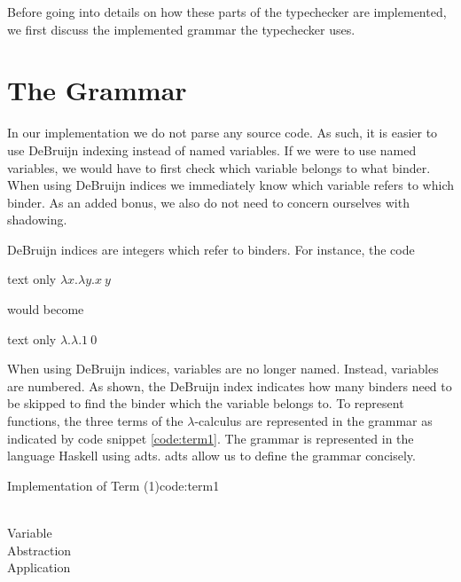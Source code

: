 Before going into details on how these parts of the typechecker are implemented, we first discuss the implemented grammar the typechecker uses.

\section{The Grammar}
In our implementation we do not parse any source code.
As such, it is easier to use DeBruijn indexing instead of named variables.
If we were to use named variables, we would have to first check which variable belongs to what binder.
When using DeBruijn indices we immediately know which variable refers to which binder.
As an added bonus, we also do not need to concern ourselves with shadowing.

DeBruijn indices are integers which refer to binders.
For instance, the code
\begin{changemargin}{1cm}{0cm}
\begin{expansionno}{text only}
$\lambda x.\lambda y. x \: y$
\end{expansionno}
\end{changemargin}
would become
\begin{changemargin}{1cm}{0cm}
\begin{expansionno}{text only}
$\lambda. \lambda. 1 \: 0$
\end{expansionno}
\end{changemargin}

When using DeBruijn indices, variables are no longer named. 
Instead, variables are numbered.
As shown, the DeBruijn index indicates how many binders need to be skipped to find the binder which the variable belongs to.
To represent functions, the three terms of the $\lambda$-calculus are represented in the grammar as indicated by code snippet \ref{code:term1}.  
The grammar is represented in the language Haskell using \glspl{adt}.
\glspl{adt} allow us to define the grammar concisely. 

\begin{texexptitled}{Implementation of Term (1)}{code:term1}
\begin{hscode}\SaveRestoreHook
{}%
%
%
%
%
%
\>[B]{}\;\mathrel{=}\<[E]%
\\[\blanklineskip]%
\>[B]{}\;\<[13]%
\>[13]{}\mathrel{=}{}\<[13E]%
\>[17]{}\;\<[37]%
\>[37]{}\mbox{\onelinecomment  Variable}{}\<[E]%
\\
\>[13]{}\mid {}\<[13E]%
\>[17]{}\;\;\<[37]%
\>[37]{}\mbox{\onelinecomment  Abstraction }{}\<[E]%
\\
\>[13]{}\mid {}\<[13E]%
\>[17]{}\;\;\<[37]%
\>[37]{}\mbox{\onelinecomment  Application }{}\<[E]%
\ColumnHook
\end{hscode}\resethooks
\end{texexptitled}

